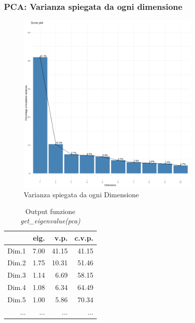 \begin{frame}[fragile]
\frametitle{PCA: Varianza spiegata da ogni dimensione}
\begin{minipage}{0.45\textwidth}
\begin{figure}[H]
    \centering
    \includegraphics[width=0.8\textwidth]{Img/PCA001.png}
    \caption{Varianza spiegata da ogni Dimensione}
\end{figure}
\end{minipage}%
\hspace{2em}
\begin{minipage}{0.45\textwidth}
\begin{table}[H]
\centering
\begin{tabular}{rrrr}
  \hline
 & eig. & v.p. & c.v.p. \\ 
  \hline
Dim.1 & 7.00 & 41.15 & 41.15 \\ 
  Dim.2 & 1.75 & 10.31 & 51.46 \\ 
  Dim.3 & 1.14 & 6.69 & 58.15 \\ 
  Dim.4 & 1.08 & 6.34 & 64.49 \\ 
  Dim.5 & 1.00 & 5.86 & 70.34 \\ 
  ... & ... & ... & ... \\
   \hline
\end{tabular}
\caption{Output funzione \textit{get\_eigenvalue(pca)}}
\label{fig:get_eigenvalue(pca)}
\end{table}
\end{minipage}%
\end{frame}

